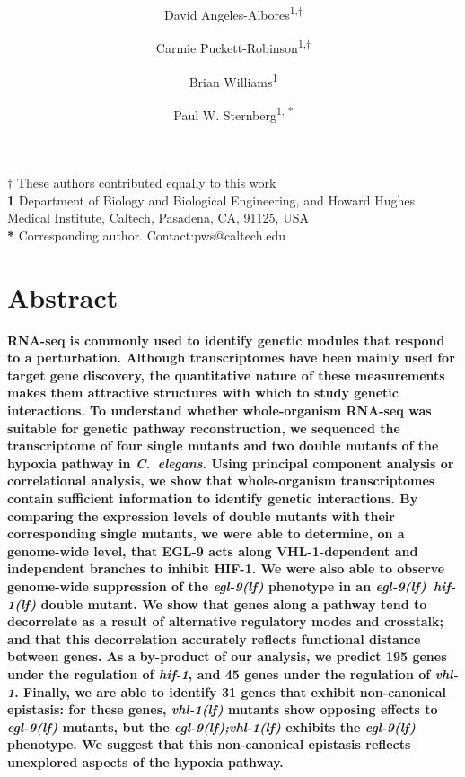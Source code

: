 \documentclass[10pt, onecolumn]{article}
\title{
  \Large
  \textbf{\titleone}
}
\author{David Angeles-Albores\textsuperscript{1,$\dagger{}$}
\and{}
Carmie Puckett-Robinson\textsuperscript{1,$\dagger{}$}
\and{}
Brian Williams\textsuperscript{1}
\and{}
Paul W. Sternberg\textsuperscript{1, *}
}
\newcommand{\cel}{\emph{C.~elegans}}
\newcommand{\gene}[1]{\emph{#1}}
\newcommand{\egl}{\emph{\mbox{egl-9}(lf)}}
\newcommand{\vhl}{\emph{\mbox{vhl-1}(lf)}}
\newcommand{\eglvhl}{\emph{\mbox{egl-9(lf);vhl-1(lf)}}}
\newcommand{\eglhif}{\emph{\mbox{egl-9(lf)}~\mbox{hif-1(lf)}}}
\newcommand{\eglp}{EGL-9}
\newcommand{\vhlp}{VHL-1}
\newcommand{\hifp}{HIF-1}
\newcommand{\vhltargets}{45} %
\newcommand{\hiftargets}{195}
\newcommand{\hifohtargets}{31}
\begin{document}
\sloppy{}
\linenumbers


\maketitle
\textbf{$\dagger$} These authors contributed equally to this work\\
\textbf{1} Department of Biology and Biological Engineering,
and Howard Hughes Medical Institute, Caltech, Pasadena, CA, 91125, USA\\
\textbf{*} Corresponding author. Contact:pws@caltech.edu

\section*{Abstract}
\textbf{
RNA-seq is commonly used to identify genetic modules that respond to a
perturbation. Although transcriptomes have been mainly used for target gene
discovery, the quantitative nature of these measurements makes them attractive
structures with which to study genetic interactions. To understand whether
whole-organism RNA-seq was suitable for genetic pathway reconstruction, we
sequenced the transcriptome of four single mutants and two double mutants of the
hypoxia pathway in \cel{}. Using principal component analysis or correlational
analysis, we show that whole-organism transcriptomes contain sufficient information
to identify genetic interactions. By comparing the expression levels of double
mutants with their corresponding single mutants, we were able to determine, on a
genome-wide level, that \eglp{} acts along \vhlp{}-dependent and independent
branches to inhibit \hifp{}. We were also able to observe genome-wide suppression
of the \egl{} phenotype in an \eglhif{} double mutant. We show that genes along
a pathway tend to decorrelate as a result of alternative regulatory modes and
crosstalk; and that this decorrelation accurately reflects functional distance
between genes. As a by-product of our analysis, we predict \hiftargets{} genes
under the regulation of \gene{hif-1}, and \vhltargets{} genes under the regulation
of \gene{vhl-1}. Finally, we are able to identify \hifohtargets{} genes that exhibit
non-canonical epistasis: for these genes, \vhl{} mutants show opposing effects to
\egl{} mutants, but the \eglvhl{} exhibits the \egl{} phenotype. We suggest that
this non-canonical epistasis reflects unexplored aspects of the hypoxia pathway.
}
\vspace{10mm}
\end{document}
